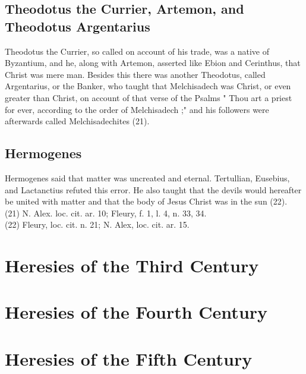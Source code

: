\documentclass[12pt]{book}
\begin{document}
\section{Theodotus the Currier, Artemon, and Theodotus Argentarius}
Theodotus the Currier, so called on account of his trade, was a native of Byzantium, and he, along
with Artemon, asserted like Ebion and Cerinthus, that Christ was mere man. Besides this there was 
another Theodotus, called Argentarius, or the Banker, who taught that Melchisadech was Christ, or even
greater than Christ, on account of that verse of the Psalms " Thou art a priest for ever, according to the
order of Melchisadech ;" and his followers were afterwards called Melchisadechites (21).
\section{Hermogenes}
Hermogenes said that matter was uncreated and eternal. Tertullian, Eusebius, and Lactanctius refuted
this error. He also taught that the devils would hereafter be united with matter and that the body of Jesus
Christ was in the sun (22).\\
(21) N. Alex. loc. cit. ar. 10; Fleury, f. 1, l. 4, n. 33, 34. \\
(22) Fleury, loc. cit. n. 21; N. Alex, loc. cit. ar. 15.\\

\chapter{Heresies of the Third Century}
\chapter{Heresies of the Fourth Century}
\chapter{Heresies of the Fifth Century}
\end{document}
